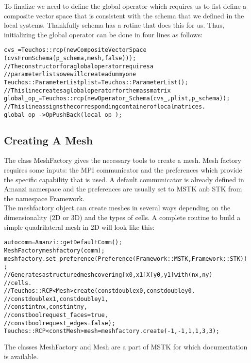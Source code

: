 %
To finalize we need to define the global operator which requires us to fist define a composite vector space that is consistent with the schema that we defined in the local systems. Thankfully schema has a rotine that does this for us. Thus, initializing the global operator can be done in four lines as follows:
\begin{alltt}
	cvs_ = Teuchos::rcp( new CompositeVectorSpace 
	(cvsFromSchema(p_schema, mesh,false)) );
	//The constructor for a global operator requires a 
	//parameter list so we will create a dummy one
	Teuchos::ParameterList plist = Teuchos::ParameterList();
	//This line creates a global operator for the mass matrix
	global_op_ = Teuchos::rcp(new Operator_Schema(cvs_, plist, p_schema));
	//This line assigns the corresponding container of local matrices.
	global_op_->OpPushBack(local_op_);
\end{alltt}
%
\subsection{Creating A Mesh}\label{CreatingAMesh}
The class MeshFactory gives the necessary tools to create a mesh. Mesh factory requires some inputs: the MPI communicator and the preferences which provide the specific capability that is used. A default communicator is already defined in Amanzi namespace and the preferences are usually set to MSTK anb STK from the namespace Framework.\\
The meshfactory object can create meshes in several ways depending on the dimensionality (2D or 3D) and the types of cells. A complete routine to build a simple quadrilateral mesh in 2D will look like this: 
%
\begin{alltt}
	auto comm = Amanzi::getDefaultComm();
	MeshFactory meshfactory(comm);
	meshfactory.set_preference(Preference({Framework::MSTK, Framework::STK}));
	// Generates a structured mesh covering [x0,x1] X [y0,y1] with (nx, ny)
	// cells.
	//  Teuchos::RCP<Mesh> create(const double x0, const double y0,
	//                           const double x1, const double y1,
	//                           const int nx, const int ny,
	//                           const bool request_faces=true,
	//                           const bool request_edges=false);
	Teuchos::RCP<const Mesh> mesh = meshfactory.create(-1,-1,1,1,3,3);
\end{alltt}
%
The classes MeshFactory and Mesh are a part of MSTK for which documentation is available. 
%
